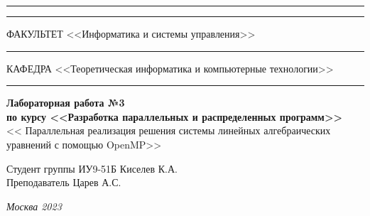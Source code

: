\documentclass[a4paper, 14pt]{extarticle}
\begin{document}
\begin{titlepage}
\vspace{-25pt}
\hspace{-35pt}\rule{\textwidth}{2.3pt}

\vspace*{-20.3pt}
\hspace{-35pt}\rule{\textwidth}{0.4pt}

\vspace{1.5ex}
\hspace{-35pt} \noindent \small ФАКУЛЬТЕТ\hspace{80pt} <<Информатика и системы управления>>

\vspace*{-16pt}
\hspace{47pt}\rule{0.83\textwidth}{0.4pt}

\vspace{0.5ex}
\hspace{-35pt} \noindent \small КАФЕДРА\hspace{50pt} <<Теоретическая информатика и компьютерные технологии>>

\vspace*{-16pt}
\hspace{30pt}\rule{0.866\textwidth}{0.4pt}
  
\vspace{11em}

\begin{center}
\Large {\bf Лабораторная работа №3 } \\ 
\large {\bf по курсу <<Разработка параллельных и распределенных программ>>} \\

\large << Параллельная реализация решения системы линейных алгебраических
уравнений с помощью OpenMP>> \\
\end{center}\normalsize

\vspace{8em}


\begin{flushright}
  {Студент группы ИУ9-51Б Киселев К.А. \hspace*{15pt}\\ 
  \vspace{2ex}
  Преподаватель Царев А.С.\hspace*{15pt}}
\end{flushright}

\bigskip

\vfill
 

\begin{center}
\textsl{Москва 2023}
\end{center}
\end{titlepage}
\end{document}
